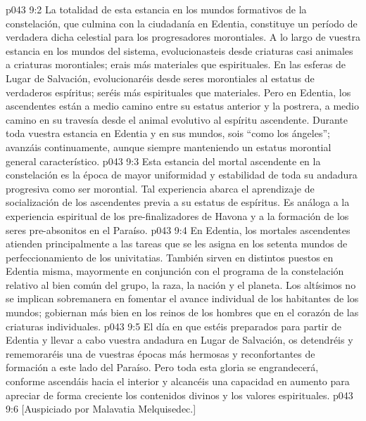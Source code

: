 \vs p043 9:2 \pc La totalidad de esta estancia en los mundos formativos de la constelación, que culmina con la ciudadanía en Edentia, constituye un período de verdadera dicha celestial para los progresadores morontiales. A lo largo de vuestra estancia en los mundos del sistema, evolucionasteis desde criaturas casi animales a criaturas morontiales; erais más materiales que espirituales. En las esferas de Lugar de Salvación, evolucionaréis desde seres morontiales al estatus de verdaderos espíritus; seréis más espirituales que materiales. Pero en Edentia, los ascendentes están a medio camino entre su estatus anterior y la postrera, a medio camino en su travesía desde el animal evolutivo al espíritu ascendente. Durante toda vuestra estancia en Edentia y en sus mundos, sois “como los ángeles”; avanzáis continuamente, aunque siempre manteniendo un estatus morontial general característico.
\vs p043 9:3 Esta estancia del mortal ascendente en la constelación es la época de mayor uniformidad y estabilidad de toda su andadura progresiva como ser morontial. Tal experiencia abarca el aprendizaje de socialización de los ascendentes previa a su estatus de espíritus. Es análoga a la experiencia espiritual de los pre\hyp{}finalizadores de Havona y a la formación de los seres pre\hyp{}absonitos en el Paraíso.
\vs p043 9:4 \pc En Edentia, los mortales ascendentes atienden principalmente a las tareas que se les asigna en los setenta mundos de perfeccionamiento de los univitatias. También sirven en distintos puestos en Edentia misma, mayormente en conjunción con el programa de la constelación relativo al bien común del grupo, la raza, la nación y el planeta. Los altísimos no se implican sobremanera en fomentar el avance individual de los habitantes de los mundos; gobiernan más bien en los reinos de los hombres que en el corazón de las criaturas individuales.
\vs p043 9:5 El día en que estéis preparados para partir de Edentia y llevar a cabo vuestra andadura en Lugar de Salvación, os detendréis y rememoraréis una de vuestras épocas más hermosas y reconfortantes de formación a este lado del Paraíso. Pero toda esta gloria se engrandecerá, conforme ascendáis hacia el interior y alcancéis una capacidad en aumento para apreciar de forma creciente los contenidos divinos y los valores espirituales.
\vsetoff
\vs p043 9:6 [Auspiciado por Malavatia Melquisedec.]
